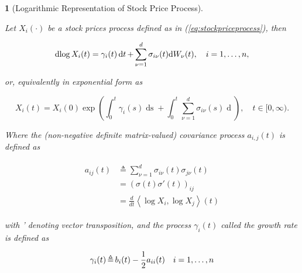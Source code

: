 \documentclass[british]{amsart}
\numberwithin{equation}{section}
\numberwithin{figure}{section}
\theoremstyle{plain}
\newtheorem{thm}{\protect\theoremname}[section]
\theoremstyle{definition}
\theoremstyle{plain}
\theoremstyle{plain}
\theoremstyle{plain}
\theoremstyle{remark}
\theoremstyle{plain}
\providecommand{\theoremname}{Theorem}
\renewcommand{\d}[1]{\mathop{\mathrm{d}{#1}}}
\newcommand{\ranget}{t\in[0,\infty)}
\newcommand{\defeq}{\mathop{\triangleq}}
\begin{document}
\begin{thm} [Logarithmic Representation of Stock Price Process]
	\label{thm:logarithmicrepresentation}

	Let $X_{i}(\cdot)$ be a stock prices process defined as in 
	(\ref{eq:stockpriceprocess}), then 

	\begin{equation} 
		\d{\log{X_{i}(t)}} = 
			\gamma_{i}(t)\d{t} + 
			\sum_{\nu=1}^{d} \sigma_{i\nu}(t){\d{W_{\nu}(t)}}, 
		\quad \rangei,
	\end{equation}

	or, equivalently in exponential form as

	\begin{equation*}
		X_{i}(t) = X_{i}(0) 
				\exp{ 
					\left(
						\int_{0}^{t} \gamma_{i}(s)\d{s} + \int_{0}^{t} 
						\sum_{\nu=1}^{d} \sigma_{i\nu}(s){\d{W_{\nu}(s)}} 
					\right)
				}, 
		\quad \ranget.
	\end{equation*}

	Where the (non-negative definite matrix-valued) \textit{covariance process} 
	$a_{i,j}(t)$ is defined as
	
	\begin{gather}
		\label{eq:covarianceprocess}
		\begin{split}
			a_{ij}(t)  
				& \defeq \sum_{\nu=1}^{d}\sigma_{i\nu}(t)\sigma_{j\nu}(t) \\ 
				& = \left( \sigma(t)\sigma'(t) \right)_{ij} \\
				& = \frac{d}{dt}\left\langle \log X_{i},\log X_{j}\right\rangle(t)
		\end{split}
	\end{gather}

	with ' denoting vector transposition, and the process $\gamma_{i}(t)$ called 
	the \textit{growth rate} is	defined as

	\begin{equation}
		\label{eq:gamma}
		\gamma_{i}(t)\defeq b_{i}(t)-\frac{1}{2}a_{ii}(t)
		\quad \rangei
	\end{equation}

\end{thm}
\end{document}
